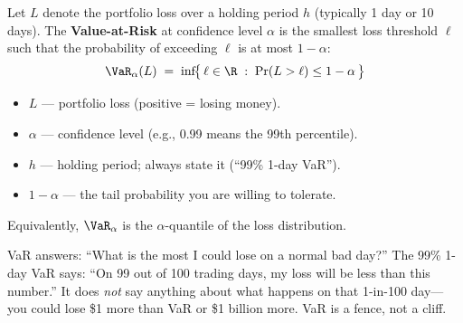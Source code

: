 \begin{definition}
Let $L$ denote the portfolio loss over a holding period $h$ (typically 1 day
or 10 days).  The \textbf{Value-at-Risk} at confidence level $\alpha$ is the
smallest loss threshold $\ell$ such that the probability of exceeding $\ell$
is at most $1-\alpha$:
\begin{equation}
\label{eq:var-def}
\VaR_\alpha(L) \;=\; \inf\!\bigl\{\,\ell \in \R \;:\;
  \Pr(L > \ell) \le 1-\alpha\,\bigr\}
\end{equation}
\begin{itemize}[nosep]
  \item $L$ --- portfolio loss (positive = losing money).
  \item $\alpha$ --- confidence level (e.g., 0.99 means the 99th percentile).
  \item $h$ --- holding period; always state it (``99\% 1-day VaR'').
  \item $1-\alpha$ --- the tail probability you are willing to tolerate.
\end{itemize}
Equivalently, $\VaR_\alpha$ is the $\alpha$-quantile of the loss
distribution.
\end{definition}

\begin{intuition}
VaR answers: ``What is the most I could lose on a normal bad day?''
The 99\% 1-day VaR says: ``On 99 out of 100 trading days, my loss will be
less than this number.''  It does \emph{not} say anything about
what happens on that 1-in-100 day---you could lose \$1 more than VaR
or \$1 billion more.  VaR is a fence, not a cliff.
\end{intuition}

